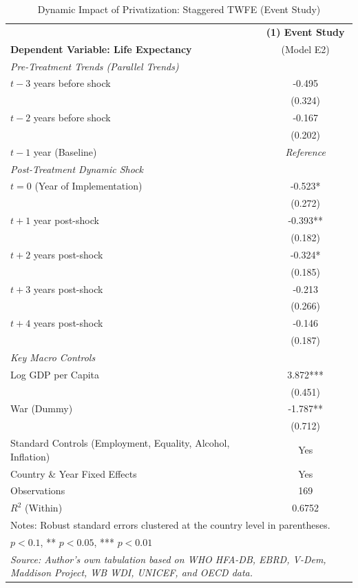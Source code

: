 \documentclass[en,magisterska]{pracamgr}
\begin{document}
\begin{table}[H]
\centering
\caption{Dynamic Impact of Privatization: Staggered TWFE (Event Study)}
\label{tab:event_study}
\footnotesize
\begin{tabular}{l c}
\toprule
 & \textbf{(1) Event Study} \\
\textbf{Dependent Variable: Life Expectancy} & (Model E2) \\
\midrule
\textit{Pre-Treatment Trends (Parallel Trends)} & \\
$t-3$ years before shock & -0.495 \\
 & (0.324) \\
$t-2$ years before shock & -0.167 \\
 & (0.202) \\
$t-1$ year (Baseline) & \textit{Reference} \\
\midrule
\textit{Post-Treatment Dynamic Shock} & \\
$t=0$ (Year of Implementation) & -0.523* \\
 & (0.272) \\
$t+1$ year post-shock & -0.393** \\
 & (0.182) \\
$t+2$ years post-shock & -0.324* \\
 & (0.185) \\
$t+3$ years post-shock & -0.213 \\
 & (0.266) \\
$t+4$ years post-shock & -0.146 \\
 & (0.187) \\
\midrule
\textit{Key Macro Controls} & \\
Log GDP per Capita & 3.872*** \\
 & (0.451) \\
War (Dummy) & -1.787** \\
 & (0.712) \\
\midrule
Standard Controls (Employment, Equality, Alcohol, Inflation) & Yes \\
Country \& Year Fixed Effects & Yes \\
Observations & 169 \\
$R^2$ (Within) & 0.6752 \\
\bottomrule
\multicolumn{2}{l}{\scriptsize Notes: Robust standard errors clustered at the country level in parentheses.} \\
\multicolumn{2}{l}{\scriptsize * $p < 0.1$, ** $p < 0.05$, *** $p < 0.01$} \\
\multicolumn{2}{l}{\scriptsize \textit{Source: Author's own tabulation based on WHO HFA-DB, EBRD, V-Dem, Maddison Project, WB WDI, UNICEF, and OECD data.}} \\
\end{tabular}
\end{table}
\end{document}
